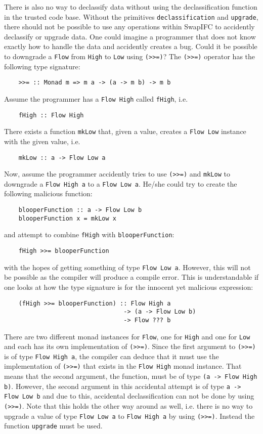 There is also no way to declassify data without using the declassification function in the trusted code base. Without the primitives {\tt declassification} and {\tt upgrade}, there should not be possible to use any operations within SwapIFC to accidently declassify or upgrade data. One could imagine a programmer that does not know exactly how to handle the data and accidently creates a bug. Could it be possible to downgrade a {\tt Flow} from {\tt High} to {\tt Low} using {\tt (>>=)}? The {\tt (>>=)} operator has the following type signature:
\begin{verbatim}
    >>= :: Monad m => m a -> (a -> m b) -> m b
\end{verbatim}
Assume the programmer has a {\tt Flow High} called {\tt fHigh}, i.e.
\begin{verbatim}
    fHigh :: Flow High
\end{verbatim}
There exists a function {\tt mkLow} that, given a value, creates a {\tt Flow Low} instance with the given value, i.e.
\begin{verbatim}
    mkLow :: a -> Flow Low a
\end{verbatim}
Now, assume the programmer accidently tries to use {\tt (>>=)} and {\tt mkLow} to downgrade a {\tt Flow High a} to a {\tt Flow Low a}. He/she could try to create the following malicious function:
\begin{verbatim}
    blooperFunction :: a -> Flow Low b
    blooperFunction x = mkLow x
\end{verbatim}
and attempt to combine {\tt fHigh} with {\tt blooperFunction}:
\begin{verbatim}
    fHigh >>= blooperFunction
\end{verbatim}
with the hopes of getting something of type {\tt Flow Low a}. However, this will not be possible as the compiler will produce a compile error. This is understandable if one looks at how the type signature is for the innocent yet malicious expression:
\begin{verbatim}
    (fHigh >>= blooperFunction) :: Flow High a
                                 -> (a -> Flow Low b)
                                 -> Flow ??? b
\end{verbatim}
There are two different monad instances for {\tt Flow}, one for {\tt High} and one for {\tt Low} and each has its own implementation of {\tt (>>=)}. Since the first argument to {\tt (>>=)} is of type {\tt Flow High a}, the compiler can deduce that it must use the implementation of {\tt (>>=)} that exists in the {\tt Flow High} monad instance. That means that the second argument, the function, must be of type {\tt (a -> Flow High b)}. However, the second argument in this accidental attempt is of type {\tt a -> Flow Low b} and due to this, accidental declassification can not be done by using {\tt (>>=)}. Note that this holds the other way around as well, i.e. there is no way to upgrade a value of type {\tt Flow Low a} to {\tt Flow High a} by using {\tt (>>=)}. Instead the function {\tt upgrade} must be used.

